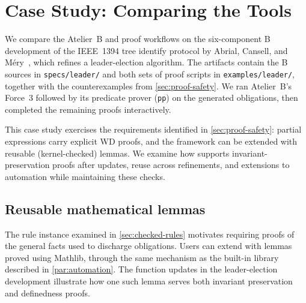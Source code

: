 \section{Case Study: Comparing the Tools}
\label{sec:proof-workflow}
\label{sec:case-study}

We compare the Atelier~B and \barrel proof workflows on the six-component B development of the IEEE~1394 tree identify protocol by Abrial, Cansell, and M\'ery~\cite{AbrialCansellMery2003}, which refines a leader-election algorithm.
The artifacts contain the B sources in \texttt{specs/leader/} and both sets of proof scripts in \texttt{examples/leader/}, together with the counterexamples from \cref{sec:proof-safety}.
We ran Atelier~B's Force~3 followed by its predicate prover (\texttt{pp}) on the generated obligations, then completed the remaining proofs interactively.

This case study exercises the requirements identified in \cref{sec:proof-safety}: partial expressions carry explicit WD proofs, and the framework can be extended with reusable (kernel-checked) lemmas.
We examine how \barrel supports invariant-preservation proofs after updates, reuse across refinements, and extensions to automation while maintaining these checks.

\subsection{Reusable mathematical lemmas}
\label{sec:workflow-lemmas}

The rule instance examined in \cref{sec:checked-rules} motivates requiring proofs of the general facts used to discharge obligations.
Users can extend \barrel with lemmas proved using Mathlib, through the same mechanism as the built-in library described in \cref{par:automation}.
The function updates in the leader-election development illustrate how one such lemma serves both invariant preservation and definedness proofs.


